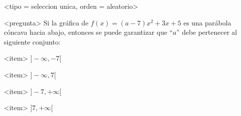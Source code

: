 <tipo = seleccion unica, orden = aleatorio>

<pregunta>
Si la gr\'afica de $f(x) = (a -7)x^2+3x +5$ es una par\'abola c\'oncava hacia abajo, entonces se puede garantizar que ``$a$'' debe pertenecer al siguiente conjunto:


<item>
$]{-}\infty, -7[$

<item>
$]{-}\infty, 7[$

<item>
$]-7, +\infty[$

<item>
$]7, +\infty[$



